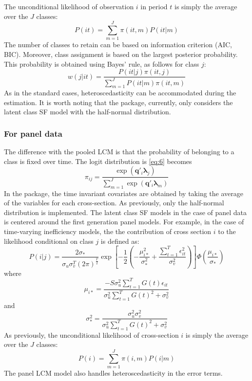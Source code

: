 \documentclass[nojss]{jss}
\begin{document}
The unconditional likelihood of observation $i$ in period $t$ is simply the average
 over the $J$ classes:
%
 $$P(it) = \sum_{m=1}^{J}\pi(it,m)P(it|m)$$
%
 The number of classes to retain can be based on information criterion (AIC, BIC).
 Moreover, class assignment is based on the largest posterior probability. This
 probability is obtained using Bayes' rule, as follows for class $j$:
%
 $$w\left(j|it\right)=\frac{P\left(it|j\right)
 \pi\left(it,j\right)}{\sum_{m=1}^JP\left(it|m\right)
 \pi\left(it, m\right)}$$
 As in the standard cases, heteroscedasticity can be accommodated during the 
 estimation. It is worth noting that the  package, currently, only considers
 the latent class SF model with the half-normal distribution.

\subsubsection{For panel data}

The difference with the pooled LCM is that the probability of belonging to 
a class is fixed over time. The logit distribution is \ref{eq:6} becomes
%
\begin{equation} \label{eq:2.1.4}
\pi_{ij} = \frac{\exp{\left(\mathbf{q}'_{i}\bm{\lambda}_j\right)}}{
\sum_{m=1}^J \exp{\left(\mathbf{q}'_{i}\bm{\lambda}_m\right)}
}
\end{equation}
%
In the  package, the time invariant covariates are obtained by taking
the average of the variables for each cross-section. As previously, only the 
half-normal distribution is implemented. The latent class SF models in the 
case of panel data is centered around the first generation panel models. For
example, in the case of time-varying inefficiency models, the the contribution 
of cross section $i$ to the likelihood conditional on class $j$ is defined as: 
%
\begin{equation}\label{eq:2.1.5}
 P(i|j) = \frac{2\sigma_*}{\sigma_u\sigma_v^T\left(2\pi\right)^{\frac{T}{2}}}\exp{\left[-\frac{1}{2}\left(-\frac{\mu_{i*}^2}{\sigma_*^2} + \frac{\sum_{t=1}^T\epsilon_{it}^2}{\sigma_v^2}\right)\right]}\Phi\left(\frac{\mu_{i*}}{\sigma_*}\right)
\end{equation}
%
where
%
$$\mu_{i*} = \frac{-S\sigma_u^2\sum_{t=1}^TG(t)\epsilon_{it}}{\sigma_u^2\sum_{t=1}^TG(t)^2 + \sigma_v^2}$$
%
and
%
$$\sigma_*^2=\frac{\sigma_u^2\sigma_v^2}{\sigma_u^2\sum_{t=1}^TG(t)^2 + \sigma_v^2}$$
%
As previously, the unconditional likelihood of cross-section $i$ is simply the average
 over the $J$ classes:
%
$$P(i) = \sum_{m=1}^{J}\pi(i,m)P(i|m)$$
%
The panel LCM model also handles heteroscedasticity in the error terms.
\end{document}

